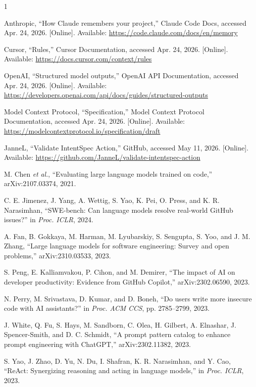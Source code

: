 \documentclass[10pt,conference]{IEEEtran}
\begin{document}
\begin{thebibliography}{1}

Anthropic, ``How Claude remembers your project,'' Claude Code Docs, accessed Apr.
24, 2026. [Online]. Available:
\url{https://code.claude.com/docs/en/memory}

Cursor, ``Rules,'' Cursor Documentation, accessed Apr. 24, 2026. [Online].
Available: \url{https://docs.cursor.com/context/rules}

OpenAI, ``Structured model outputs,'' OpenAI API Documentation, accessed Apr. 24,
2026. [Online]. Available:
\url{https://developers.openai.com/api/docs/guides/structured-outputs}

Model Context Protocol, ``Specification,'' Model Context Protocol Documentation,
accessed Apr. 24, 2026. [Online]. Available:
\url{https://modelcontextprotocol.io/specification/draft}

JanneL, ``Validate IntentSpec Action,'' GitHub, accessed May 11, 2026. [Online].
Available: \url{https://github.com/JanneL/validate-intentspec-action}

M. Chen \emph{et al.}, ``Evaluating large language models trained on code,''
arXiv:2107.03374, 2021.

C. E. Jimenez, J. Yang, A. Wettig, S. Yao, K. Pei, O. Press, and K. R.
Narasimhan, ``SWE-bench: Can language models resolve real-world GitHub issues?''
in \emph{Proc. ICLR}, 2024.

A. Fan, B. Gokkaya, M. Harman, M. Lyubarskiy, S. Sengupta, S. Yoo, and J. M.
Zhang, ``Large language models for software engineering: Survey and open
problems,'' arXiv:2310.03533, 2023.

S. Peng, E. Kalliamvakou, P. Cihon, and M. Demirer, ``The impact of AI on
developer productivity: Evidence from GitHub Copilot,'' arXiv:2302.06590, 2023.

N. Perry, M. Srivastava, D. Kumar, and D. Boneh, ``Do users write more insecure
code with AI assistants?'' in \emph{Proc. ACM CCS}, pp. 2785--2799, 2023.

J. White, Q. Fu, S. Hays, M. Sandborn, C. Olea, H. Gilbert, A. Elnashar,
J. Spencer-Smith, and D. C. Schmidt, ``A prompt pattern catalog to enhance prompt
engineering with ChatGPT,'' arXiv:2302.11382, 2023.

S. Yao, J. Zhao, D. Yu, N. Du, I. Shafran, K. R. Narasimhan, and Y. Cao,
``ReAct: Synergizing reasoning and acting in language models,'' in
\emph{Proc. ICLR}, 2023.

\end{thebibliography}
\end{document}
